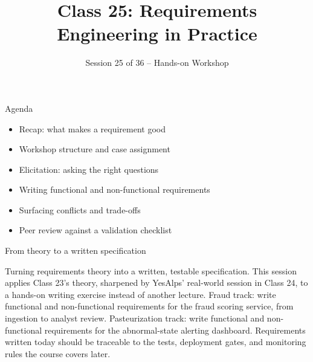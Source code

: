 

\title{Class 25: Requirements Engineering in Practice}
\subtitle{Session 25 of 36 -- Hands-on Workshop}
\author{\coursename}
\date{}



\frame{\titlepage \coursefooter}

\begin{frame}{Agenda}
\begin{itemize}
\item Recap: what makes a requirement good
\item Workshop structure and case assignment
\item Elicitation: asking the right questions
\item Writing functional and non-functional requirements
\item Surfacing conflicts and trade-offs
\item Peer review against a validation checklist
\end{itemize}
\coursefooter
\end{frame}

\begin{frame}{From theory to a written specification}
\coursefooter
\end{frame}

\coursecontextframe
{Turning requirements theory into a written, testable specification.}
{This session applies Class 23's theory, sharpened by YesAlps' real-world session in Class 24, to a hands-on writing exercise instead of another lecture.}
{Fraud track: write functional and non-functional requirements for the fraud scoring service, from ingestion to analyst review.}
{Pasteurization track: write functional and non-functional requirements for the abnormal-state alerting dashboard.}
{Requirements written today should be traceable to the tests, deployment gates, and monitoring rules the course covers later.}

